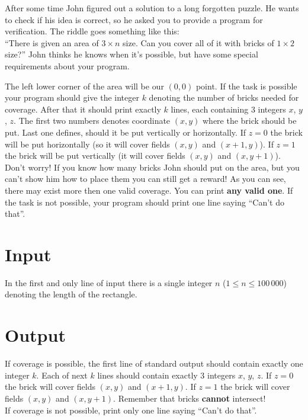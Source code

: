 \documentclass{spiral}
\begin{document}
  \makeheader

  After some time John figured out a solution to a long forgotten puzzle.
  He wants to check if his idea is correct, so he asked you to provide a program for verification.
  The riddle goes something like this:\\
  ``There is given an area of $3 \times n$ size. Can you cover all of it with bricks of $1 \times 2$ size?''
  John thinks he knows when it's possible, but have some special requirements about your program.

  The left lower corner of the area will be our $(0, 0)$ point.
  If the task is possible your program should give the integer $k$
  denoting the number of bricks needed for coverage.
  After that it should print exactly $k$ lines, each containing 3 integers $x$, $y$, $z$.
  The first two numbers denotes coordinate $(x, y)$ where the brick should be put.
  Last one defines, should it be put vertically or horizontally.
  If $z = 0$ the brick will be put horizontally (so it will cover fields $(x, y)$ and $(x + 1, y)$).
  If $z = 1$ the brick will be put vertically (it will cover fields $(x, y)$ and $(x, y + 1)$).
  Don't worry! If you know how many bricks John should put on the area,
  but you can't show him how to place them you can still get a reward!
  As you can see, there may exist more then one valid coverage. You can print \textbf{any valid one}.
  If the task is not possible, your program should print one line saying ``Can't do that''.


  \section{Input}

    In the first and only line of input there is
    a single integer $n$ ($1 \leq n \leq 100\,000$) denoting the length of the rectangle.

  \section{Output}

    If coverage is possible, the first line of standard output should contain exactly one integer $k$.
    Each of next $k$ lines should contain exactly 3 integers $x$, $y$, $z$.
    If $z = 0$ the brick will cover fields $(x, y)$ and $(x + 1, y)$.
    If $z = 1$ the brick will cover fields $(x, y)$ and $(x, y + 1)$.
    Remember that bricks \textbf{cannot} intersect!\\
    If coverage is not possible, print only one line saying ``Can't do that''.
    

\end{document}
